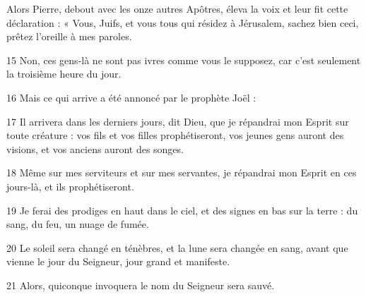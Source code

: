 Alors Pierre, debout avec les onze autres Apôtres, éleva la voix et leur fit cette déclaration : « Vous, Juifs, et vous tous qui résidez à Jérusalem, sachez bien ceci, prêtez l’oreille à mes paroles.

15 Non, ces gens-là ne sont pas ivres comme vous le supposez, car c’est seulement la troisième heure du jour.

16 Mais ce qui arrive a été annoncé par le prophète Joël :

17 Il arrivera dans les derniers jours, dit Dieu, que je répandrai mon Esprit sur toute créature : vos fils et vos filles prophétiseront, vos jeunes gens auront des visions, et vos anciens auront des songes.

18 Même sur mes serviteurs et sur mes servantes, je répandrai mon Esprit en ces jours-là, et ils prophétiseront.

19 Je ferai des prodiges en haut dans le ciel, et des signes en bas sur la terre : du sang, du feu, un nuage de fumée.

20 Le soleil sera changé en ténèbres, et la lune sera changée en sang, avant que vienne le jour du Seigneur, jour grand et manifeste.

21 Alors, quiconque invoquera le nom du Seigneur sera sauvé.